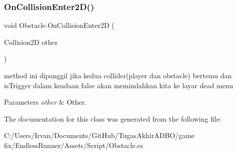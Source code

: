 \subsubsection{\texorpdfstring{On\+Collision\+Enter2\+D()}{OnCollisionEnter2D()}}
{\footnotesize\ttfamily void Obstacle.\+On\+Collision\+Enter2D (\begin{DoxyParamCaption}\item[{Collision2D}]{other }\end{DoxyParamCaption})\hspace{0.3cm}{\ttfamily [private]}}



method ini dipanggil jika kedua collider(player dan obstacle) bertemu dan is\+Trigger dalam keadaan false akan memindahkan kita ke layar dead menu 


\begin{DoxyParams}{Parameters}
{\em other} & Other.\\
\hline
\end{DoxyParams}


The documentation for this class was generated from the following file\+:\begin{DoxyCompactItemize}
\item 
C\+:/\+Users/\+Irvan/\+Documents/\+Git\+Hub/\+Tugas\+Akhir\+A\+D\+B\+O/game fix/\+Endless\+Runner/\+Assets/\+Script/Obstacle.\+cs\end{DoxyCompactItemize}
